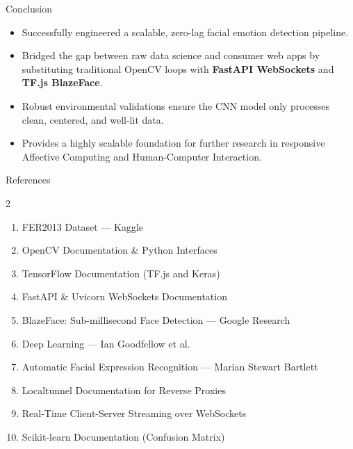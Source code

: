 \documentclass[aspectratio=169]{beamer}
\begin{document}
\begin{frame}{Conclusion}
\begin{itemize}
    \item Successfully engineered a scalable, zero-lag facial emotion detection pipeline.
    \item Bridged the gap between raw data science and consumer web apps by substituting traditional OpenCV loops with \textbf{FastAPI WebSockets} and \textbf{TF.js BlazeFace}.
    \item Robust environmental validations ensure the CNN model only processes clean, centered, and well-lit data.
    \item Provides a highly scalable foundation for further research in responsive Affective Computing and Human-Computer Interaction.
\end{itemize}
\end{frame}

\begin{frame}{References}
\scriptsize
\begin{multicols}{2}
\begin{enumerate}
    \item FER2013 Dataset — Kaggle
    \item OpenCV Documentation \& Python Interfaces
    \item TensorFlow Documentation (TF.js and Keras)
    \item FastAPI \& Uvicorn WebSockets Documentation
    \item BlazeFace: Sub-millisecond Face Detection — Google Research
    \item Deep Learning — Ian Goodfellow et al.
    \item Automatic Facial Expression Recognition — Marian Stewart Bartlett
    \item Localtunnel Documentation for Reverse Proxies
    \item Real-Time Client-Server Streaming over WebSockets
    \item Scikit-learn Documentation (Confusion Matrix)
\end{enumerate}
\end{multicols}
\end{frame}
\end{document}

